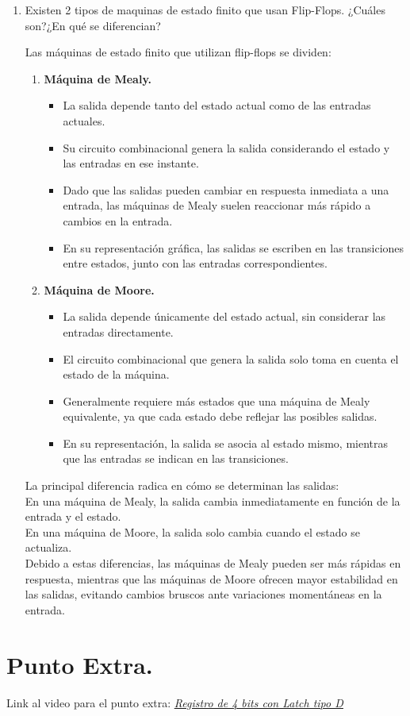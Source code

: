 \documentclass[12pt,letterpaper]{article}
\begin{document}
\begin{enumerate}
  \item Existen 2 tipos de maquinas de estado finito que usan Flip-Flops. ¿Cuáles son?¿En qué se diferencian?
    \bigskip

    Las máquinas de estado finito que utilizan flip-flops se dividen:
    
    \begin{enumerate}[label=\arabic*)]
    \item \textbf{Máquina de Mealy.}

      \begin{itemize}
      \item La salida depende tanto del estado actual como de las entradas actuales.
      \item Su circuito combinacional genera la salida considerando el estado y las entradas en ese instante.
      \item Dado que las salidas pueden cambiar en respuesta inmediata a una entrada, las máquinas de Mealy suelen reaccionar más rápido a cambios en la entrada.
      \item En su representación gráfica, las salidas se escriben en las transiciones entre estados, junto con las entradas correspondientes.
      \end{itemize}
      
    \item \textbf{Máquina de Moore.}
      \begin{itemize}
      \item La salida depende únicamente del estado actual, sin considerar las entradas directamente.
      \item El circuito combinacional que genera la salida solo toma en cuenta el estado de la máquina.
      \item Generalmente requiere más estados que una máquina de Mealy equivalente, ya que cada estado debe reflejar las posibles salidas.
      \item En su representación, la salida se asocia al estado mismo, mientras que las entradas se indican en las transiciones.
      \end{itemize}
    \end{enumerate}

    La principal diferencia radica en cómo se determinan las salidas:\\
    En una máquina de Mealy, la salida cambia inmediatamente en función de la entrada y el estado.\\
    En una máquina de Moore, la salida solo cambia cuando el estado se actualiza.\\
    Debido a estas diferencias, las máquinas de Mealy pueden ser más rápidas en respuesta, mientras que las máquinas de Moore ofrecen mayor estabilidad en las salidas, evitando cambios bruscos ante variaciones momentáneas en la entrada.
\end{enumerate}

\section*{Punto Extra.}
Link al video para el punto extra:
\href{}{\textit{\uline{Registro de 4 bits con Latch tipo D}}}
\end{document}
